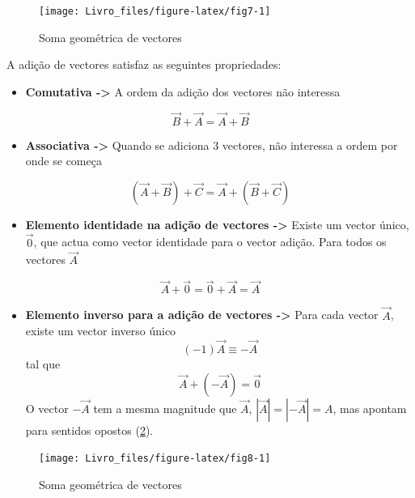 \documentclass[
  portuguese,
  ]{book}
\providecommand{\tightlist}{%
  \setlength{\itemsep}{0pt}\setlength{\parskip}{0pt}}
\begin{document}
\begin{figure}

{\centering \texttt{[image: Livro\_files/figure-latex/fig7-1]} 

}

\caption{Soma geométrica de vectores}\label{fig:fig7}
\end{figure}

A adição de vectores satisfaz as seguintes propriedades:

\begin{itemize}
\tightlist
\item
  \textbf{Comutativa -\textgreater{}} A ordem da adição dos vectores não interessa
\end{itemize}

\[\vec{B}+\vec{A}=\vec{A}+\vec{B}\]

\begin{itemize}
\tightlist
\item
  \textbf{Associativa -\textgreater{}} Quando se adiciona 3 vectores, não interessa a ordem por onde se começa
\end{itemize}

\[ (\vec{A}+\vec{B})+\vec{C}=\vec{A}+(\vec{B}+\vec{C})\]

\begin{itemize}
\tightlist
\item
  \textbf{Elemento identidade na adição de vectores -\textgreater{}} Existe um vector único, \(\vec{0}\), que actua como vector identidade para o vector adição. Para todos os vectores \(\vec{A}\)
\end{itemize}

\[\vec{A}+\vec{0}=\vec{0}+\vec{A}=\vec{A}\]

\begin{itemize}
\tightlist
\item
  \textbf{Elemento inverso para a adição de vectores -\textgreater{}} Para cada vector \(\vec{A}\), existe um vector inverso único
  \[(-1)\vec{A}\equiv-\vec{A}\]
  tal que
  \[\vec{A}+(-\vec{A})=\vec{0}\]
  O vector \(-\vec{A}\) tem a mesma magnitude que \(\vec{A}\), \(|\vec{A}|=|-\vec{A}|=A\), mas apontam para sentidos opostos (\ref{fig:fig8}).
\end{itemize}

\begin{figure}

{\centering \texttt{[image: Livro\_files/figure-latex/fig8-1]} 

}

\caption{Soma geométrica de vectores}\label{fig:fig8}
\end{figure}
\end{document}
